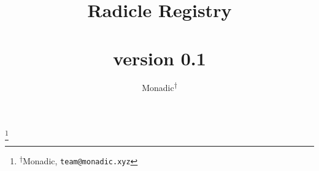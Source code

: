 \documentclass[a4paper, oneside, 1jpt, final]{amsart}
\begin{document}
\title[Radicle Registry]{Radicle Registry \\ \vspace{0.5em} \\ {\tiny version 0.1}}
\author{\Small Monadic\textsuperscript{$\dagger$}}

\thanks{\textsuperscript{$\dagger$}Monadic, \texttt{team@monadic.xyz}}

\maketitle

\setlength{\columnsep}{1cm}
\begin{multicols}{2}



\end{multicols}
\end{document}
